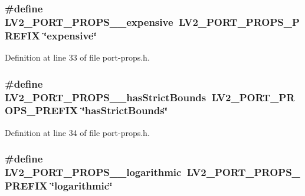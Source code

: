 \subsubsection[{\texorpdfstring{L\+V2\+\_\+\+P\+O\+R\+T\+\_\+\+P\+R\+O\+P\+S\+\_\+\+\_\+expensive}{LV2_PORT_PROPS__expensive}}]{\setlength{\rightskip}{0pt plus 5cm}\#define L\+V2\+\_\+\+P\+O\+R\+T\+\_\+\+P\+R\+O\+P\+S\+\_\+\+\_\+expensive~{\bf L\+V2\+\_\+\+P\+O\+R\+T\+\_\+\+P\+R\+O\+P\+S\+\_\+\+P\+R\+E\+F\+IX} \char`\"{}expensive\char`\"{}}\hypertarget{port-props_8h_a9fe0f6806b891042998127bd4665b4c9}{}\label{port-props_8h_a9fe0f6806b891042998127bd4665b4c9}


Definition at line 33 of file port-\/props.\+h.

\subsubsection[{\texorpdfstring{L\+V2\+\_\+\+P\+O\+R\+T\+\_\+\+P\+R\+O\+P\+S\+\_\+\+\_\+has\+Strict\+Bounds}{LV2_PORT_PROPS__hasStrictBounds}}]{\setlength{\rightskip}{0pt plus 5cm}\#define L\+V2\+\_\+\+P\+O\+R\+T\+\_\+\+P\+R\+O\+P\+S\+\_\+\+\_\+has\+Strict\+Bounds~{\bf L\+V2\+\_\+\+P\+O\+R\+T\+\_\+\+P\+R\+O\+P\+S\+\_\+\+P\+R\+E\+F\+IX} \char`\"{}has\+Strict\+Bounds\char`\"{}}\hypertarget{port-props_8h_ac56f6a35a6ea58a7cff75a6cce61dec9}{}\label{port-props_8h_ac56f6a35a6ea58a7cff75a6cce61dec9}


Definition at line 34 of file port-\/props.\+h.

\subsubsection[{\texorpdfstring{L\+V2\+\_\+\+P\+O\+R\+T\+\_\+\+P\+R\+O\+P\+S\+\_\+\+\_\+logarithmic}{LV2_PORT_PROPS__logarithmic}}]{\setlength{\rightskip}{0pt plus 5cm}\#define L\+V2\+\_\+\+P\+O\+R\+T\+\_\+\+P\+R\+O\+P\+S\+\_\+\+\_\+logarithmic~{\bf L\+V2\+\_\+\+P\+O\+R\+T\+\_\+\+P\+R\+O\+P\+S\+\_\+\+P\+R\+E\+F\+IX} \char`\"{}logarithmic\char`\"{}}\hypertarget{port-props_8h_aee003259ed882f5b6ec83647d497c3a7}{}\label{port-props_8h_aee003259ed882f5b6ec83647d497c3a7}


